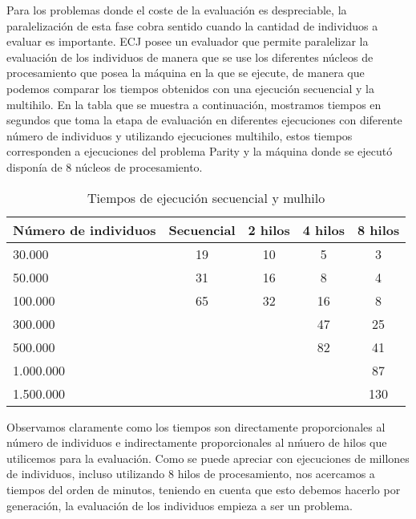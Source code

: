 \label{resultados-parity}

Para los problemas donde el coste de la evaluación es despreciable, la paralelizaci\'on de esta fase cobra sentido cuando la cantidad de individuos a evaluar es importante. ECJ posee un evaluador que permite paralelizar la evaluación de los individuos de manera que se use los diferentes núcleos de procesamiento que posea la m\'aquina en la que se ejecute, de manera que podemos comparar los tiempos obtenidos con una ejecución secuencial y la multihilo. En la tabla que se muestra a continuación, mostramos tiempos en segundos que toma la etapa de evaluación en diferentes ejecuciones con diferente n\'umero de individuos y utilizando ejecuciones multihilo, estos tiempos corresponden a ejecuciones del problema Parity y la m\'aquina donde se ejecut\'o disponía de 8 núcleos de procesamiento.

\begin{table}[H]
  \begin{center}
    \begin{center}
    \begin{tabular}{l | c c c c}
    N\'umero de individuos & Secuencial & 2 hilos & 4 hilos & 8 hilos \\ \hline
    30.000 & 19 & 10 & 5 & 3\\
    50.000 & 31 & 16 & 8 & 4\\
    100.000 & 65 & 32 & 16 & 8\\
    300.000 & & & 47 & 25\\
    500.000 & & & 82 & 41\\
    1.000.000 & & & & 87\\
    1.500.000 & & & & 130\\
    \end{tabular}
    \end{center}
    \caption{Tiempos de ejecución secuencial y mulhilo}
    \label{tabla_tiempos_ecj}
  \end{center}
\end{table}

Observamos claramente como los tiempos son directamente proporcionales al n\'umero de individuos e indirectamente proporcionales al n\'muero de hilos que utilicemos para la evaluación. Como se puede apreciar con ejecuciones de millones de individuos, incluso utilizando 8 hilos de procesamiento, nos acercamos a tiempos del orden de minutos, teniendo en cuenta que esto debemos hacerlo por generación, la evaluación de los individuos empieza a ser un problema. 

